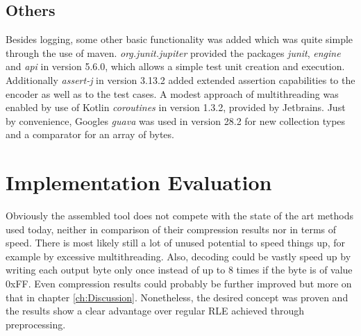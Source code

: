 \subsection{Others}
\label{ch:Implementation:sec:Impl:subsec:libs:others}
\par{
Besides logging, some other basic functionality was added which was quite simple through the use of maven. \emph{org.junit.jupiter} provided the packages \emph{junit}, \emph{engine} and \emph{api} in version 5.6.0, which allows a simple test unit creation and execution. Additionally \emph{assert-j} in version 3.13.2 added extended assertion capabilities to the encoder as well as to the test cases. A modest approach of multithreading was enabled by use of Kotlin \emph{coroutines} in version 1.3.2, provided by Jetbrains. Just by convenience, Googles \emph{guava} was used in version 28.2 for new collection types and a comparator for an array of bytes.
}


\section{Implementation Evaluation}
\label{ch:Implementation:sec:Implementation Evaluation}
\par{
Obviously the assembled tool does not compete with the state of the art methods used today, neither in comparison of their compression results nor in terms of speed. There is most likely still a lot of unused potential to speed things up, for example by excessive multithreading. Also, decoding could be vastly speed up by writing each output byte only once instead of up to 8 times if the byte is of value 0xFF. Even compression results could probably be further improved but more on that in chapter \ref{ch:Discussion}. Nonetheless, the desired concept was proven and the results show a clear advantage over regular RLE achieved through preprocessing. 
}

